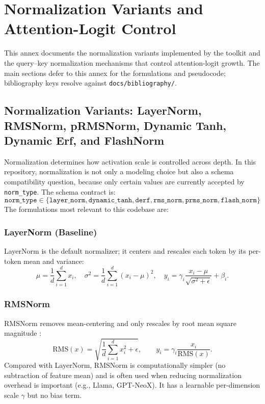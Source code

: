 \section{Normalization Variants and Attention-Logit Control}
\label{sec:annex-normalization}

This annex documents the normalization variants implemented by the toolkit and the query--key normalization mechanisms that control attention-logit growth. The main sections defer to this annex for the formulations and pseudocode; bibliography keys resolve against \texttt{docs/bibliography/}.

\subsection{Normalization Variants: LayerNorm, RMSNorm, pRMSNorm, Dynamic Tanh, Dynamic Erf, and FlashNorm}

Normalization determines how activation scale is controlled across depth. In this repository, normalization is not only a modeling choice but also a schema compatibility question, because only certain values are currently accepted by \texttt{norm\_type}. The schema contract is:
\[
\texttt{norm\_type} \in \{\texttt{layer\_norm}, \texttt{dynamic\_tanh}, \texttt{derf}, \texttt{rms\_norm}, \texttt{prms\_norm}, \texttt{flash\_norm}\}
\]
The formulations most relevant to this codebase are:

\subsubsection{LayerNorm (Baseline)}
LayerNorm \citep{ba2016layer} is the default normalizer; it centers and rescales each token by its per-token mean and variance:
\[
\mu = \frac{1}{d}\sum_{i=1}^{d} x_i, \quad \sigma^2 = \frac{1}{d}\sum_{i=1}^{d}(x_i - \mu)^2, \quad y_i = \gamma_i \frac{x_i - \mu}{\sqrt{\sigma^2 + \epsilon}} + \beta_i.
\]

\subsubsection{RMSNorm}
RMSNorm removes mean-centering and only rescales by root mean square magnitude \citep{zhang_root_2019}:
\[
\mathrm{RMS}(x)=\sqrt{\frac{1}{d}\sum_{i=1}^{d}x_i^2+\epsilon},\qquad
y_i=\gamma_i\frac{x_i}{\mathrm{RMS}(x)}.
\]
Compared with LayerNorm, RMSNorm is computationally simpler (no subtraction of feature mean) and is often used when reducing normalization overhead is important (e.g., Llama, GPT-NeoX). It has a learnable per-dimension scale $\gamma$ but no bias term.

